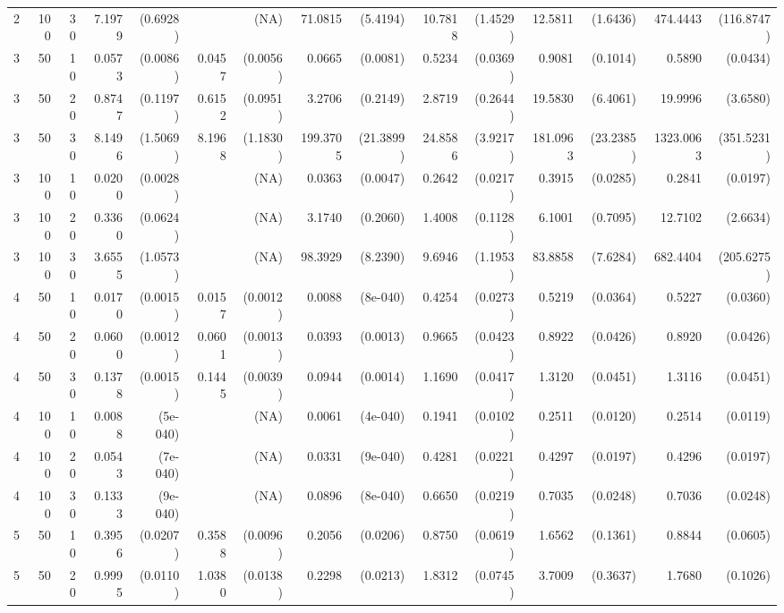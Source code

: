 \begin{table}[ht]
\begin{small}
\begin{tabular}{lrrrrrrrrrrrrrr}
  2 & 100 & 30 & 7.1979 & (0.6928) &  & (NA) & 71.0815 & (5.4194) & 10.7818 & (1.4529) & 12.5811 & (1.6436) & 474.4443 & (116.8747) \\ 
  3 & 50 & 10 & 0.0573 & (0.0086) & 0.0457 & (0.0056) & 0.0665 & (0.0081) & 0.5234 & (0.0369) & 0.9081 & (0.1014) & 0.5890 & (0.0434) \\ 
  3 & 50 & 20 & 0.8747 & (0.1197) & 0.6152 & (0.0951) & 3.2706 & (0.2149) & 2.8719 & (0.2644) & 19.5830 & (6.4061) & 19.9996 & (3.6580) \\ 
  3 & 50 & 30 & 8.1496 & (1.5069) & 8.1968 & (1.1830) & 199.3705 & (21.3899) & 24.8586 & (3.9217) & 181.0963 & (23.2385) & 1323.0063 & (351.5231) \\ 
  3 & 100 & 10 & 0.0200 & (0.0028) &  & (NA) & 0.0363 & (0.0047) & 0.2642 & (0.0217) & 0.3915 & (0.0285) & 0.2841 & (0.0197) \\ 
  3 & 100 & 20 & 0.3360 & (0.0624) &  & (NA) & 3.1740 & (0.2060) & 1.4008 & (0.1128) & 6.1001 & (0.7095) & 12.7102 & (2.6634) \\ 
  3 & 100 & 30 & 3.6555 & (1.0573) &  & (NA) & 98.3929 & (8.2390) & 9.6946 & (1.1953) & 83.8858 & (7.6284) & 682.4404 & (205.6275) \\ 
  4 & 50 & 10 & 0.0170 & (0.0015) & 0.0157 & (0.0012) & 0.0088 & (8e-040) & 0.4254 & (0.0273) & 0.5219 & (0.0364) & 0.5227 & (0.0360) \\ 
  4 & 50 & 20 & 0.0600 & (0.0012) & 0.0601 & (0.0013) & 0.0393 & (0.0013) & 0.9665 & (0.0423) & 0.8922 & (0.0426) & 0.8920 & (0.0426) \\ 
  4 & 50 & 30 & 0.1378 & (0.0015) & 0.1445 & (0.0039) & 0.0944 & (0.0014) & 1.1690 & (0.0417) & 1.3120 & (0.0451) & 1.3116 & (0.0451) \\ 
  4 & 100 & 10 & 0.0088 & (5e-040) &  & (NA) & 0.0061 & (4e-040) & 0.1941 & (0.0102) & 0.2511 & (0.0120) & 0.2514 & (0.0119) \\ 
  4 & 100 & 20 & 0.0543 & (7e-040) &  & (NA) & 0.0331 & (9e-040) & 0.4281 & (0.0221) & 0.4297 & (0.0197) & 0.4296 & (0.0197) \\ 
  4 & 100 & 30 & 0.1333 & (9e-040) &  & (NA) & 0.0896 & (8e-040) & 0.6650 & (0.0219) & 0.7035 & (0.0248) & 0.7036 & (0.0248) \\ 
  5 & 50 & 10 & 0.3956 & (0.0207) & 0.3588 & (0.0096) & 0.2056 & (0.0206) & 0.8750 & (0.0619) & 1.6562 & (0.1361) & 0.8844 & (0.0605) \\ 
  5 & 50 & 20 & 0.9995 & (0.0110) & 1.0380 & (0.0138) & 0.2298 & (0.0213) & 1.8312 & (0.0745) & 3.7009 & (0.3637) & 1.7680 & (0.1026) \\ 

\end{tabular}
\end{small}
\end{table}
